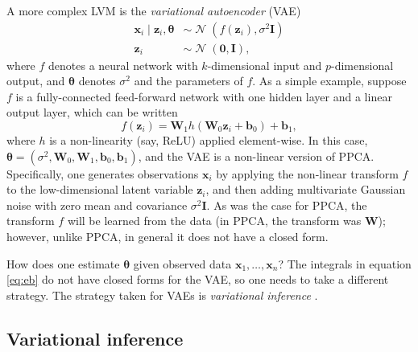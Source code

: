 \documentclass[reqno,11pt]{amsart}
\DeclareMathOperator\N{\mathcal{N}}
\newcommand\mi{\mathbf{I}}
\newcommand\mw{\mathbf{W}}
\newcommand\vb{\mathbf{b}}
\newcommand\vtheta{\boldsymbol{\theta}}
\newcommand\vx{\mathbf{x}}
\newcommand\vz{\mathbf{z}}
\begin{document}
A more complex LVM is the \emph{variational autoencoder} (VAE)
\cite{DBLP:journals/corr/KingmaW13}
%
\begin{align}
  \vx_i \mid \vz_i, \vtheta &\sim \N(f(\vz_i), \sigma^2 \mi)\\
  \vz_i &\sim \N(\boldsymbol{0}, \mi),
\end{align}
%
where $f$ denotes a neural network with $k$-dimensional input and
$p$-dimensional output, and $\vtheta$ denotes $\sigma^2$ and the parameters of
$f$. As a simple example, suppose $f$ is a fully-connected feed-forward network
with one hidden layer and a linear output layer, which can be written
%
\begin{equation}
  f(\vz_i) = \mw_1 h(\mw_0 \vz_i + \vb_0) + \vb_1,
\end{equation}
%
where $h$ is a non-linearity (say, ReLU) applied element-wise. In this case,
$\vtheta = (\sigma^2, \mw_0, \mw_1, \vb_0, \vb_1)$, and the VAE is a non-linear
version of PPCA. Specifically, one generates observations $\vx_i$ by applying
the non-linear transform $f$ to the low-dimensional latent variable $\vz_i$,
and then adding multivariate Gaussian noise with zero mean and covariance
$\sigma^2 \mi$. As was the case for PPCA, the transform $f$ will be learned
from the data (in PPCA, the transform was $\mw$); however, unlike PPCA, in
general it does not have a closed form.

How does one estimate $\vtheta$ given observed data $\vx_1, \ldots, \vx_n$? The
integrals in equation \eqref{eq:eb} do not have closed forms for the VAE, so one needs
to take a different strategy. The strategy taken for VAEs is \emph{variational
inference} \cite{10.1080/01621459.2017.1285773}.

\subsection{Variational inference}
\end{document}
